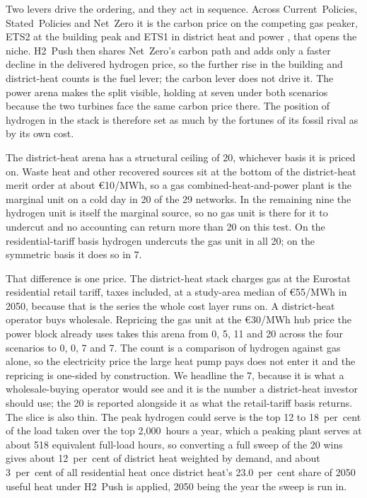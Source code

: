 Two levers drive the ordering, and they act in sequence. Across
Current~Policies, Stated~Policies and Net~Zero it is the carbon price on the competing
gas peaker, ETS2 at the building peak and ETS1 in district heat and
power \citep{Fabra2009etspassthrough}, that opens the niche.
H2~Push then shares Net~Zero's carbon path and adds only a faster decline in the
delivered hydrogen price, so the further rise in the building and district-heat counts is the fuel lever; the carbon lever does not drive it. The power arena makes the split
visible, holding at seven under both scenarios because the two turbines face the same
carbon price there. The position of hydrogen in the stack is therefore set as much by
the fortunes of its fossil rival as by its own cost.

The district-heat arena has a structural ceiling of 20, whichever basis it is priced on.
Waste heat and other recovered sources sit at the bottom of the district-heat merit order
at about \euro{}10/MWh, so a gas combined-heat-and-power plant is the marginal unit on a
cold day in 20 of the 29 networks. In the remaining nine the hydrogen unit is itself the
marginal source, so no gas unit is there for it to undercut and no accounting can return
more than 20 on this test. On the residential-tariff basis hydrogen
undercuts the gas unit in all 20; on the symmetric basis it does so in 7.

That difference is one price. The district-heat stack charges gas at the Eurostat
residential retail tariff, taxes included, at a study-area median of \euro{}55/MWh in
2050, because that is the series the whole cost layer runs on.
A district-heat operator buys wholesale. Repricing the gas unit at the \euro{}30/MWh hub
price the power block already uses takes this arena from 0, 5, 11 and 20 across the four
scenarios to 0, 0, 7 and 7. The count is a comparison of hydrogen against gas alone, so
the electricity price the large heat pump pays does not enter it and the repricing is
one-sided by construction. We headline the 7, because it is what a wholesale-buying
operator would see and it is the number a district-heat investor should use; the 20 is
reported alongside it as what the retail-tariff basis returns. The slice is also thin. The peak hydrogen could serve is the top 12 to 18~per~cent of
the load taken over the top 2{,}000~hours a year, which a peaking plant serves at about 518
equivalent full-load hours, so converting a full sweep of the 20 wins gives about 12~per~cent of district heat
weighted by demand, and about 3~per~cent of all residential heat once district heat's 23.0~per~cent share of 2050 useful heat under H2~Push is applied, 2050 being the year the sweep is run in.

